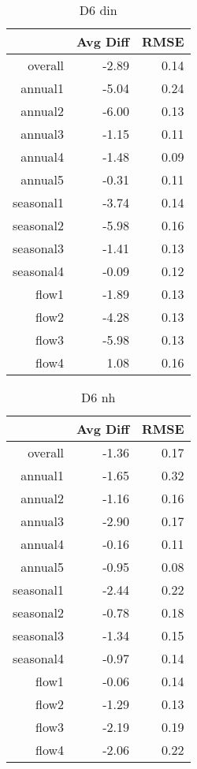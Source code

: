 \begin{table}[H]
\centering
\begin{tabular}{rrr}
  \hline
 & Avg Diff & RMSE \\ 
  \hline
overall & -2.89 & 0.14 \\ 
  annual1 & -5.04 & 0.24 \\ 
  annual2 & -6.00 & 0.13 \\ 
  annual3 & -1.15 & 0.11 \\ 
  annual4 & -1.48 & 0.09 \\ 
  annual5 & -0.31 & 0.11 \\ 
  seasonal1 & -3.74 & 0.14 \\ 
  seasonal2 & -5.98 & 0.16 \\ 
  seasonal3 & -1.41 & 0.13 \\ 
  seasonal4 & -0.09 & 0.12 \\ 
  flow1 & -1.89 & 0.13 \\ 
  flow2 & -4.28 & 0.13 \\ 
  flow3 & -5.98 & 0.13 \\ 
  flow4 & 1.08 & 0.16 \\ 
   \hline
\end{tabular}
\caption{D6 din} 
\end{table}
\begin{table}[H]
\centering
\begin{tabular}{rrr}
  \hline
 & Avg Diff & RMSE \\ 
  \hline
overall & -1.36 & 0.17 \\ 
  annual1 & -1.65 & 0.32 \\ 
  annual2 & -1.16 & 0.16 \\ 
  annual3 & -2.90 & 0.17 \\ 
  annual4 & -0.16 & 0.11 \\ 
  annual5 & -0.95 & 0.08 \\ 
  seasonal1 & -2.44 & 0.22 \\ 
  seasonal2 & -0.78 & 0.18 \\ 
  seasonal3 & -1.34 & 0.15 \\ 
  seasonal4 & -0.97 & 0.14 \\ 
  flow1 & -0.06 & 0.14 \\ 
  flow2 & -1.29 & 0.13 \\ 
  flow3 & -2.19 & 0.19 \\ 
  flow4 & -2.06 & 0.22 \\ 
   \hline
\end{tabular}
\caption{D6 nh} 
\end{table}
